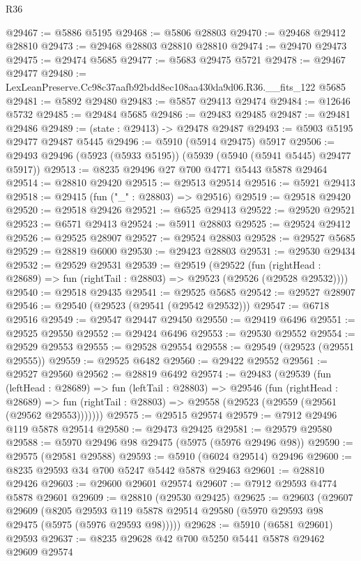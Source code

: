 \begin{lexlean}{R36}
\begin{coremodule}
@29467 := @5886 @5195
@29468 := @5806 @28803
@29470 := @29468 @29412 @28810
@29473 := @29468 @28803 @28810 @28810
@29474 := @29470 @29473
@29475 := @29474 @5685
@29477 := @5683 @29475 @5721
@29478 := @29467 @29477
@29480 := LexLeanPreserve.Cc98c37aafb92bdd8ec108aa430da9d06.R36.__fits_122 @5685
@29481 := @5892 @29480
@29483 := @5857 @29413 @29474
@29484 := @12646 @5732
@29485 := @29484 @5685
@29486 := @29483 @29485
@29487 := @29481 @29486
@29489 := (state : @29413) -> @29478 @29487
@29493 := @5903 @5195 @29477 @29487 @5445
@29496 := @5910 (@5914 @29475) @5917
@29506 := @29493 @29496 (@5923 (@5933 @5195)) (@5939 (@5940 (@5941 @5445) @29477 @5917))
@29513 := @8235 @29496 @27 @700 @4771 @5443 @5878 @29464
@29514 := @28810 @29420
@29515 := @29513 @29514
@29516 := @5921 @29413
@29518 := @29415 (fun ("_" : @28803) => @29516)
@29519 := @29518 @29420
@29520 := @29518 @29426
@29521 := @6525 @29413
@29522 := @29520 @29521
@29523 := @6571 @29413
@29524 := @5911 @28803
@29525 := @29524 @29412
@29526 := @29525 @28907
@29527 := @29524 @28803
@29528 := @29527 @5685
@29529 := @28819 @6000
@29530 := @29423 @28803
@29531 := @29530 @29434
@29532 := @29529 @29531
@29539 := @29519
    (@29522
      (fun (rightHead : @28689) => fun (rightTail : @28803) => @29523 (@29526 (@29528 @29532))))
@29540 := @29518 @29435
@29541 := @29525 @5685
@29542 := @29527 @28907
@29546 := @29540 (@29523 (@29541 (@29542 @29532)))
@29547 := @6718 @29516
@29549 := @29547 @29447 @29450
@29550 := @29419 @6496
@29551 := @29525 @29550
@29552 := @29424 @6496
@29553 := @29530 @29552
@29554 := @29529 @29553
@29555 := @29528 @29554
@29558 := @29549 (@29523 (@29551 @29555))
@29559 := @29525 @6482
@29560 := @29422 @29552
@29561 := @29527 @29560
@29562 := @28819 @6492
@29574 := @29483
    (@29539
      (fun (leftHead : @28689) =>
      fun (leftTail : @28803) =>
      @29546
        (fun (rightHead : @28689) =>
        fun (rightTail : @28803) => @29558 (@29523 (@29559 (@29561 (@29562 @29553)))))))
@29575 := @29515 @29574
@29579 := @7912 @29496 @119 @5878 @29514
@29580 := @29473 @29425
@29581 := @29579 @29580
@29588 := @5970 @29496 @98 @29475 (@5975 (@5976 @29496 @98))
@29590 := @29575 (@29581 @29588)
@29593 := @5910 (@6024 @29514) @29496
@29600 := @8235 @29593 @34 @700 @5247 @5442 @5878 @29463
@29601 := @28810 @29426
@29603 := @29600 @29601 @29574
@29607 := @7912 @29593 @4774 @5878 @29601
@29609 := @28810 (@29530 @29425)
@29625 := @29603
    (@29607
      @29609
      (@8205 @29593 @119 @5878 @29514 @29580 (@5970 @29593 @98 @29475 (@5975 (@5976 @29593 @98)))))
@29628 := @5910 (@6581 @29601) @29593
@29637 := @8235 @29628 @42 @700 @5250 @5441 @5878 @29462 @29609 @29574

\end{coremodule}
\end{lexlean}
